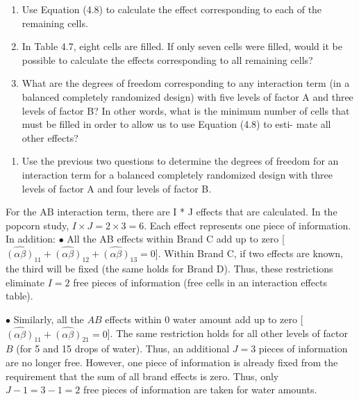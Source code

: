 \documentclass[
]{report}
\providecommand{\tightlist}{%
  \setlength{\itemsep}{0pt}\setlength{\parskip}{0pt}}
\theoremstyle{definition}
\theoremstyle{definition}
\theoremstyle{definition}
\theoremstyle{definition}
\theoremstyle{remark}
\begin{document}
\begin{enumerate}
\def\labelenumi{\alph{enumi}.}
\tightlist
\item
  Use Equation (4.8) to calculate the effect corresponding to each of the remaining cells.\\
\item
  In Table 4.7, eight cells are filled. If only seven cells were filled, would it be possible to calculate
  the effects corresponding to all remaining cells?\\
\item
  What are the degrees of freedom corresponding to any interaction term (in a balanced completely
  randomized design) with five levels of factor A and three levels of factor B? In other words, what is
  the minimum number of cells that must be filled in order to allow us to use Equation (4.8) to esti-
  mate all other effects?
\end{enumerate}

\begin{enumerate}
\def\labelenumi{\arabic{enumi}.}
\setcounter{enumi}{32}
\tightlist
\item
  Use the previous two questions to determine the degrees of freedom for an interaction term for a balanced completely randomized design with three levels of factor A and four levels of factor B.
\end{enumerate}

For the AB interaction term, there are I * J effects that are calculated. In the popcorn study, \(I \times J = 2 \times 3 = 6\). Each effect represents one piece of information. In addition:
\(\bullet\) All the AB effects within Brand C add up to zero {[}\(\hat{(\alpha\beta)}_{11} + \hat{(\alpha\beta)}_{12} + \hat{(\alpha\beta)}_{13}= 0\){]}. Within Brand C,
if two effects are known, the third will be fixed (the same holds for Brand D). Thus, these restrictions
eliminate \(I = 2\) free pieces of information (free cells in an interaction effects table).

\(\bullet\) Similarly, all the \(AB\) effects within 0 water amount add up to zero {[}\(\hat{(\alpha\beta)}_{11} + \hat{(\alpha\beta)}_{21} = 0\){]}. The same restriction holds for all other levels of factor \(B\) (for 5 and 15 drops of water). Thus, an additional \(J = 3\) pieces of information are no longer free. However, one piece of information is already fixed from the requirement that the sum of all brand effects is zero. Thus, only \(J - 1 = 3 - 1 = 2\) free pieces of information are taken for water amounts.
\end{document}

